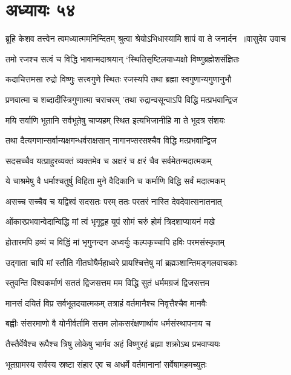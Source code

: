 \chapter{अध्यायः ५४}
\threelineshloka
{ब्रूहि केशव तत्त्वेन त्वमध्यात्ममनिन्दितम्}
{श्रुत्वा श्रेयोऽभिधास्यामि शापं वा ते जनार्दन ॥वासुदेव उवाच}
{}


\twolineshloka
{तमो रजश्च सत्वं च विद्धि भावान्मदाश्रयान्}
{`स्थितिसृष्टिलयाध्यक्षो विष्णुब्रह्मेशसंज्ञितः}


\twolineshloka
{कदाचित्तमसा रुद्रो विष्णुः सत्त्वगुणे स्थितः}
{रजस्यपि तथा ब्रह्मा स्वगुणान्यगुणानुभौ}


\twolineshloka
{प्रणवात्मा च शब्दादींस्त्रिगुणात्मा चराचरम्}
{'तथा रुद्रान्वसून्वाऽपि विद्धि मत्प्रभवान्द्विज}


\twolineshloka
{मयि सर्वाणि भूतानि सर्वभूतेषु चाप्यहम्}
{स्थित इत्यभिजानीहि मा ते भूदत्र संशयः}


\twolineshloka
{तथा दैत्यगणान्सर्वान्यक्षगन्धर्वराक्षसान्}
{नागानप्सरसश्चैव विद्धि मत्प्रभवान्द्विज}


\twolineshloka
{सदसच्चैव यत्प्राहुरव्यक्तं व्यक्तमेव च}
{अक्षरं च क्षरं चैव सर्वमेतन्मदात्मकम्}


\twolineshloka
{ये चाश्रमेषु वै धर्माश्चतुर्षु विहिता मुने}
{वैदिकानि च कर्माणि विद्धि सर्वं मदात्मकम्}


\twolineshloka
{असच्च सच्चैव च यद्विश्वं सदसतः परम्}
{ततः परतरं नास्ति देवदेवात्सनातनात्}


\twolineshloka
{ओंकारप्रभवान्वेदान्विद्धि मां त्वं भृगूद्वह}
{यूपं सोमं चरुं होमं त्रिदशाप्यायनं मखे}


\twolineshloka
{होतारमपि हव्यं च विद्धिं मां भृगुनन्दन}
{अध्वर्युः कल्पकृच्चापि हविः परमसंस्कृतम्}


\twolineshloka
{उद्गाता चापि मां स्तौति गीतघोषैर्महाध्वरे}
{प्रायश्चित्तेषु मां ब्रह्मञ्शान्तिमङ्गलवाचकाः}


\twolineshloka
{स्तुवन्ति विश्वकर्माणं सततं द्विजसत्तम}
{मम विद्धि सुतं धर्ममग्रजं द्विजसत्तम}


\twolineshloka
{मानसं दयितं विप्र सर्वभूतदयात्मकम्}
{तत्राहं वर्तमानैश्च निवृत्तैश्चैव मानवैः}


\twolineshloka
{बह्वीः संसरमाणो वै योनीर्वर्तामि सत्तम}
{लोकसरंक्षणार्थाय धर्मसंस्थापनाय च}


\twolineshloka
{तैस्तैर्वेषैश्च रूपैश्च त्रिषु लोकेषु भार्गव}
{अहं विष्णुरहं ब्रह्मा शक्रोऽथ प्रभवाप्ययः}


\twolineshloka
{भूतग्रामस्य सर्वस्य स्रष्टा संहार एव च}
{अधर्मे वर्तमानानां सर्वेषामहमच्युतः}


